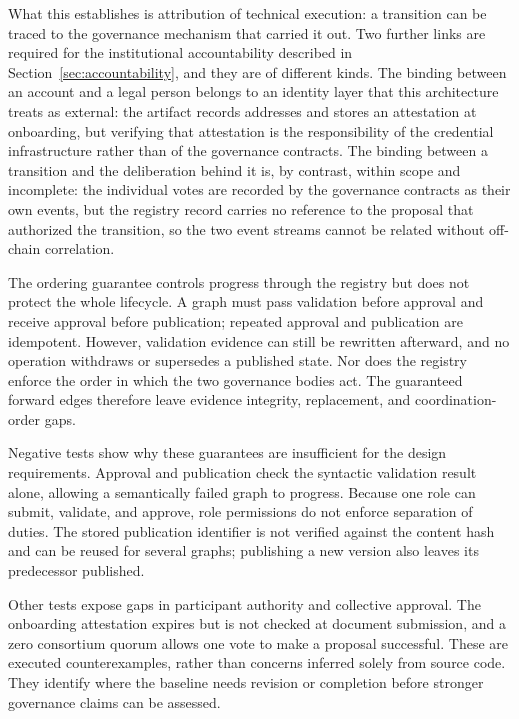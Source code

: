 \documentclass[journal]{IEEEtran}
\begin{document}
What this establishes is attribution of technical execution: a
transition can be traced to the governance mechanism that carried it
out. Two further links are required for the institutional
accountability described in Section~\ref{sec:accountability}, and they
are of different kinds. The binding between an account and a legal
person belongs to an identity layer that this architecture treats as
external: the artifact records addresses and stores an attestation at
onboarding, but verifying that attestation is the responsibility of the
credential infrastructure rather than of the governance contracts. The
binding between a transition and the deliberation behind it is, by
contrast, within scope and incomplete: the individual votes are recorded
by the governance contracts as their own events, but the registry record
carries no reference to the proposal that authorized the transition, so
the two event streams cannot be related without off-chain correlation.

The ordering guarantee controls progress through the registry but does
not protect the whole lifecycle. A graph must pass validation before
approval and receive approval before publication; repeated approval and
publication are idempotent. However, validation evidence can still be
rewritten afterward, and no operation withdraws or supersedes a published
state. Nor does the registry enforce the order in which the two governance
bodies act. The guaranteed forward edges therefore leave evidence integrity,
replacement, and coordination-order gaps.

Negative tests show why these guarantees are insufficient for the design
requirements. Approval and publication check the syntactic validation
result alone, allowing a semantically failed graph to progress. Because
one role can submit, validate, and approve, role permissions do not enforce
separation of duties. The stored publication identifier is not verified
against the content hash and can be reused for several graphs; publishing
a new version also leaves its predecessor published.

Other tests expose gaps in participant authority and collective approval.
The onboarding attestation expires but is not checked at document submission,
and a zero consortium quorum allows one vote to make a proposal successful.
These are executed counterexamples, rather than concerns inferred solely
from source code. They identify where the baseline needs revision or
completion before stronger governance claims can be assessed.
\end{document}
